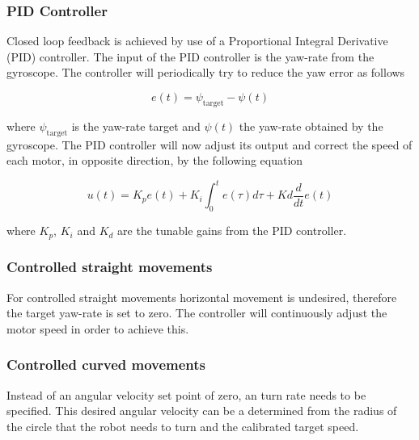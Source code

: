 \subsubsection{PID Controller}


Closed loop feedback is achieved by use of a Proportional Integral Derivative (PID) controller.
The input of the PID controller is the yaw-rate from the gyroscope.
The controller will periodically try to reduce the yaw error as follows

\begin{equation}
	e(t) = \psi_{\text{target}} - \psi(t)
\end{equation}

\noindent
where $\psi_{\text{target}}$ is the yaw-rate target and $\psi(t)$ the yaw-rate obtained by the gyroscope.
The PID controller will now adjust its output and correct the speed of each motor, in opposite direction, by the following equation

\begin{equation}
u(t) = K_{p}e(t) + K_{i} \int_{0}^{t}e(\tau)d\tau + Kd\frac{d}{dt}e(t)
\end{equation}

\noindent
where $K_{p}$, $K_{i}$ and $K_{d}$ are the tunable gains from the PID controller.

\subsubsection{Controlled straight movements}

For controlled straight movements horizontal movement is undesired, therefore the target yaw-rate is set to zero.
The controller will continuously adjust the motor speed in order to achieve this.

\subsubsection{Controlled curved movements} 

Instead of an angular velocity set point of zero, an turn rate needs to be specified.
This desired angular velocity can be a determined from the radius of the circle that the robot needs to turn and the calibrated target speed.

